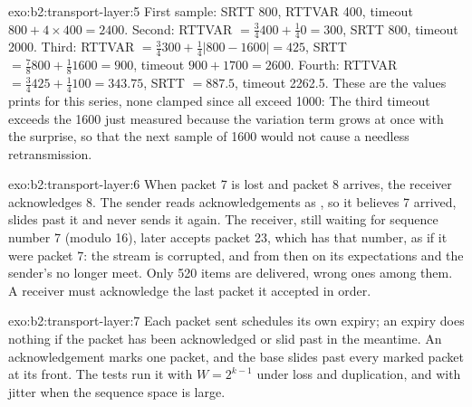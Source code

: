 \begin{solution}{exo:b2:transport-layer:5}
First sample: SRTT 800, RTTVAR 400, timeout $800 + 4 \times 400 = 2400$. Second: RTTVAR $= \frac34 400 + \frac14 0 =
300$, SRTT 800, timeout 2000. Third: RTTVAR $= \frac34 300 + \frac14 |800 - 1600| = 425$, SRTT $= \frac78 800 +
\frac18 1600 = 900$, timeout $900 + 1700 = 2600$. Fourth: RTTVAR $= \frac34 425 + \frac14 100 = 343.75$, SRTT $=
887.5$, timeout 2262.5. These are the values  prints for this series, none clamped since all exceed 1000:
The third timeout exceeds
the 1600 just measured because the variation term grows at once with the surprise, so that the next sample of 1600
would not cause a needless retransmission.
\end{solution}

\begin{solution}{exo:b2:transport-layer:6}
When packet 7 is lost and packet 8 arrives, the receiver acknowledges 8. The sender reads acknowledgements as
, so it believes 7 arrived, slides past it and never sends it again. The receiver, still waiting for
sequence number 7 (modulo 16), later accepts packet 23, which has that number, as if it were packet 7: the stream is
corrupted, and from then on its expectations and the sender's no longer meet. Only 520 items are delivered, wrong
ones among them. A  receiver must acknowledge the last packet it accepted in order.
\end{solution}

\begin{solution}{exo:b2:transport-layer:7}
Each packet sent schedules its own expiry; an expiry does nothing if the packet has been acknowledged or slid past
in the meantime. An acknowledgement marks one packet, and the base slides past every marked packet at its front. The
tests run it with $W = 2^{k-1}$ under loss and duplication, and with jitter when the sequence space is large.
\end{solution}

